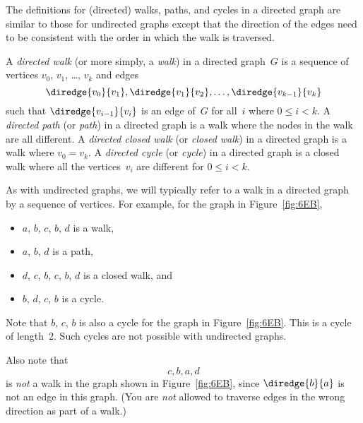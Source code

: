 The definitions for (directed) walks, paths, and cycles in a directed
graph are similar to those for undirected graphs except that the
direction of the edges need to be consistent with the order in which
the walk is traversed.

\begin{definition}

A \emph{directed walk} (or more simply, a \emph{walk}) in a directed
graph~$G$ is a sequence of vertices $v_0$, $v_1$, \dots, $v_k$ and
edges
\begin{equation*}
    \diredge{v_0}{v_1}, \diredge{v_1}{v_2}, \dots, \diredge{v_{k - 1}}{v_k}
\end{equation*}
such that $\diredge{v_{i - 1}}{v_i}$ is an edge of~$G$ for all~$i$ where $0
\le i < k$.  A \emph{directed path} (or \emph{path}) in a directed
graph is a walk where the nodes in the walk are all different.  A
\emph{directed closed walk} (or \emph{closed walk}) in a directed
graph is a walk where $v_0 = v_k$.  A \emph{directed cycle} (or
\emph{cycle}) in a directed graph is a closed walk where all the
vertices~$v_i$ are different for $0 \le i < k$.
\end{definition}

As with undirected graphs, we will typically refer to a walk in a
directed graph by a sequence of vertices.  For example, for the graph
in Figure~\ref{fig:6EB},
\begin{itemize}

\item
$a$, $b$, $c$, $b$, $d$ is a walk,

\item
$a$, $b$, $d$ is a path,

\item
$d$, $c$, $b$, $c$, $b$, $d$ is a closed walk, and

\item
$b$, $d$, $c$, $b$ is a cycle.

\end{itemize}

Note that $b$, $c$, $b$ is also a cycle for the graph in
Figure~\ref{fig:6EB}.  This is a cycle of length~2.  Such cycles are
not possible with undirected graphs.

Also note that
\begin{equation*}
    c, b, a, d
\end{equation*}
is \emph{not} a walk in the graph shown in Figure~\ref{fig:6EB}, since
$\diredge{b}{a}$ is not an edge in this graph.  (You are \emph{not}
allowed to traverse edges in the wrong direction as part of a walk.)

